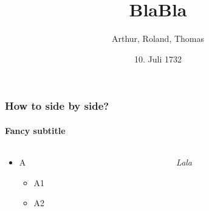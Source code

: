 \documentclass{beamer}
\date{10. Juli 1732}
\title{BlaBla}
\author{Arthur, Roland, Thomas}
\begin{document}
\begin{frame}
    \titlepage
\end{frame}


\begin{frame}
    \frametitle{How to side by side?}
    \framesubtitle{Fancy subtitle}

    \begin{columns}
        \begin{column}{0.5\textwidth}
            \begin{itemize}
                \item A
                      \begin{itemize}
                          \item A1
                          \item A2
                      \end{itemize}
            \end{itemize}
        \end{column}
        \begin{column}{0.5\textwidth}
            \textit{Lala}
        \end{column}
    \end{columns}
\end{frame}








\end{document}
